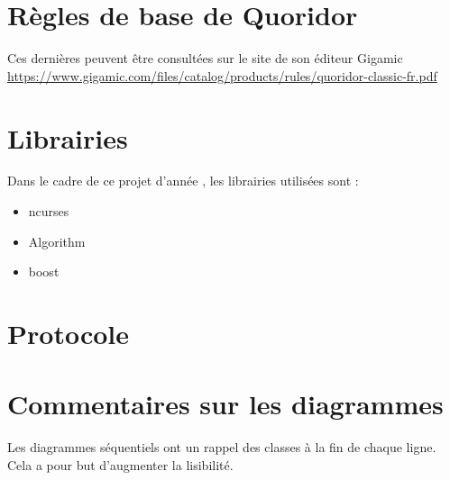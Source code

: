 \documentclass[french, utf8]{article}
\begin{document}
\section{Règles de base de Quoridor}
Ces dernières peuvent être consultées sur le site de son éditeur Gigamic \\\href{https://www.gigamic.com/files/catalog/products/rules/quoridor-classic-fr.pdf}{https://www.gigamic.com/files/catalog/products/rules/quoridor-classic-fr.pdf}
\section{Librairies}
Dans le cadre de ce projet d'année , les librairies utilisées sont :
\begin{itemize}
    \item ncurses
    \item Algorithm
    \item boost
\end{itemize}
\section{Protocole}


\section{Commentaires sur les diagrammes}
Les diagrammes séquentiels ont un rappel des classes à la fin de chaque ligne. Cela a pour but d'augmenter la lisibilité.
\end{document}
